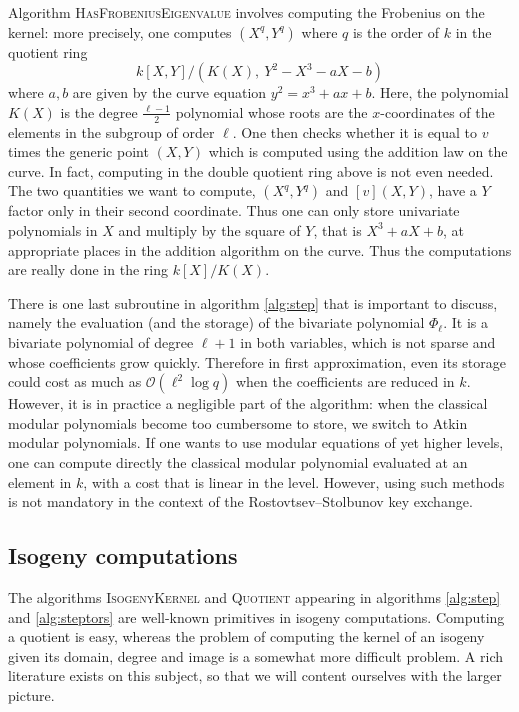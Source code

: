 \documentclass{article}
\renewcommand{\O}{\mathcal{O}}
\newcommand{\algnamestyle}[1]{\textsc{#1}}
\theoremstyle{definition}
\begin{document}
Algorithm \algnamestyle{HasFrobeniusEigenvalue}
involves computing the Frobenius on the kernel: more precisely, one computes $(X^q, Y^q)$
where $q$ is the order of $k$ in the quotient ring
\[
k[X, Y]/(K(X),\ Y^2 - X^3 - aX - b)
\]
where $a, b$ are given by the curve equation $y^2 = x^3 + ax + b$. Here, the polynomial
$K(X)$ is the degree $\frac{\ell-1}{2}$ polynomial whose roots are the $x$-coordinates of the elements
in the subgroup of order $\ell$. One then checks whether it is equal to $v$ times the generic
point $(X, Y)$ which is computed using the addition law on the curve. In fact, computing
in the double quotient ring above is not even needed. The two quantities we want to compute,
$(X^q, Y^q)$ and $[v](X, Y)$, have a $Y$ factor only in their second coordinate. Thus one
can only store univariate polynomials in $X$ and multiply by the square of $Y$, that is
$X^3 + aX + b$, at appropriate places in the addition algorithm on the curve. Thus the
computations are really done in the ring $k[X]/K(X)$.

There is one last subroutine in algorithm \ref{alg:step} that is important to discuss,
namely the evaluation (and the storage) of the bivariate polynomial $\Phi_\ell$. It is a bivariate
polynomial of degree $\ell + 1$ in both variables, which is not sparse and whose coefficients
grow quickly. Therefore in first approximation, even its storage could cost as much as
$\O(\ell^2 \log q)$ when the coefficients are reduced in $k$. However, it is in practice a negligible
part of the algorithm: when the classical modular polynomials become too cumbersome to store, we
switch to Atkin modular polynomials. If one wants to use modular equations of yet higher levels,
one can compute directly the classical modular polynomial evaluated at an element in $k$,
with a cost that is linear in the level. However, using such methods is not mandatory in
the context of the Rostovtsev--Stolbunov key exchange.

\subsection{Isogeny computations}

The algorithms \algnamestyle{IsogenyKernel} and \algnamestyle{Quotient} appearing in
algorithms \ref{alg:step} and \ref{alg:steptors} are well-known primitives in isogeny
computations. Computing a quotient is easy, whereas the problem of computing the
kernel of an isogeny given its domain, degree and image is a somewhat more difficult
problem. A rich literature exists on this subject, so that we will content ourselves
with the larger picture.
\end{document}
